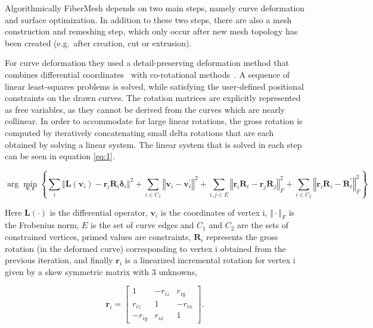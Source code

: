 Algorithmically FiberMesh depends on two main steps, namely curve deformation and surface optimization. In addition to these two steps, there are also a mesh construction and remeshing step, which only occur after new mesh topology has been created (e.g.\ after creation, cut or extrusion). 

For curve deformation they used a detail-preserving deformation method that combines differential coordinates~\cite{Sorkine2006} with co-rotational methods~\cite{Felippa2007}. A sequence of linear least-squares problems is solved, while satisfying the user-defined positional constraints on the drawn curves. The rotation matrices are explicitly represented as free variables, as they cannot be derived from the curves which are nearly collinear. In order to accommodate for large linear  rotations, the gross rotation is computed by iteratively concatenating small delta rotations that are each obtained by solving a linear system. The linear system that is solved in each step can be seen in equation \ref{eq:1}.  

\begin{equation} \label{eq:1}
	\arg\min_{\mathbf{v, r}} \left\lbrace \sum_{i} \left\Vert \mathbf{L}\left(\mathbf{v}_{i}\right) - \mathbf{r}_{i}\mathbf{R}_{i}\mathbf{\delta}_{i}\right\Vert^{2} + \sum_{i \in C_{1}} \left\Vert \mathbf{v}_{i} - \mathbf{v}_{i}^{'} \right\Vert^{2} + \sum_{i,j \in E}	 \left\Vert \mathbf{r}_{i}\mathbf{R}_{i} - \mathbf{r}_{j}\mathbf{R}_{j} \right\Vert^{2}_{F} + \sum_{i \in C_{2}} \left\Vert \mathbf{r}_{i}\mathbf{R}_{i} - \mathbf{R}_{i}^{'} \right\Vert^{2}_{F} \right\rbrace 
\end{equation}

Here $\mathbf{L}(\cdot)$ is the differential operator, $\mathbf{v}_{i}$ is the coordinates of vertex i, $\Vert \cdot \Vert_{F}$ is the Frobenius norm, $E$ is the set of curve edges and $C_{1}$ and $C_{2}$ are the sets of constrained vertices, primed values are constraints, $\mathbf{R}_{i}$ represents the gross rotation (in the deformed curve) corresponding to vertex i obtained from the previous iteration, and finally $\mathbf{r}_{i}$ is a linearized incremental rotation for vertex i given by a skew symmetric matrix with 3 unknowns,

\begin{equation*}
\mathbf{r}_{i} = \left[ \begin{matrix}
1 & -r_{iz} & r_{iy} \\
r_{iz} & 1 & -r_{ix} \\ 
-r_{iy} & r_{ix} & 1
\end{matrix} \right].
\end{equation*}

